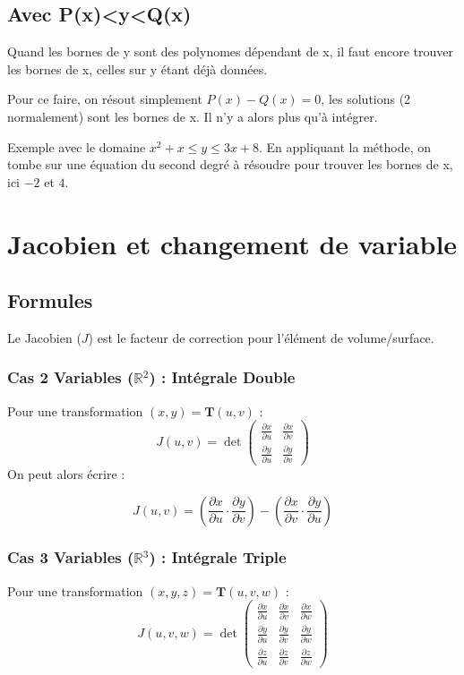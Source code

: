 \documentclass[french]{yLectureNote}
\begin{document}
\subsection{Avec P(x)<y<Q(x)}
Quand les bornes de y sont des polynomes dépendant de x, il faut encore trouver les bornes de x, celles sur y étant déjà données.

Pour ce faire, on résout simplement \(P(x)-Q(x) = 0\), les solutions (2 normalement) sont les bornes de x. Il n'y a alors plus qu'à intégrer.

Exemple avec le domaine \(x^2+x\leq y\leq 3x+8\). En appliquant la méthode, on tombe sur une équation du second degré à résoudre pour trouver les bornes de x, ici \(-2\) et \(4\).
\section{Jacobien et changement de variable}
\subsection{Formules}
Le Jacobien ($J$) est le facteur de correction pour l'élément de volume/surface.

\subsubsection{Cas 2 Variables ($\mathbb{R}^2$) : Intégrale Double}

Pour une transformation $(x, y) = \mathbf{T}(u, v)$ :
$$
J(u, v) = \det \begin{pmatrix}
\frac{\partial x}{\partial u} & \frac{\partial x}{\partial v} \\
\frac{\partial y}{\partial u} & \frac{\partial y}{\partial v}
\end{pmatrix}
$$
On peut alors écrire :
\begin{proposition}
$$J(u, v) = \left(\frac{\partial x}{\partial u} \cdot \frac{\partial y}{\partial v}\right) - \left(\frac{\partial x}{\partial v} \cdot \frac{\partial y}{\partial u}\right)$$
\end{proposition}
\subsubsection{Cas 3 Variables ($\mathbb{R}^3$) : Intégrale Triple}

Pour une transformation $(x, y, z) = \mathbf{T}(u, v, w)$ :
$$
J(u, v, w) = \det \begin{pmatrix}
\frac{\partial x}{\partial u} & \frac{\partial x}{\partial v} & \frac{\partial x}{\partial w} \\
\frac{\partial y}{\partial u} & \frac{\partial y}{\partial v} & \frac{\partial y}{\partial w} \\
\frac{\partial z}{\partial u} & \frac{\partial z}{\partial v} & \frac{\partial z}{\partial w}
\end{pmatrix}
$$
\end{document}
